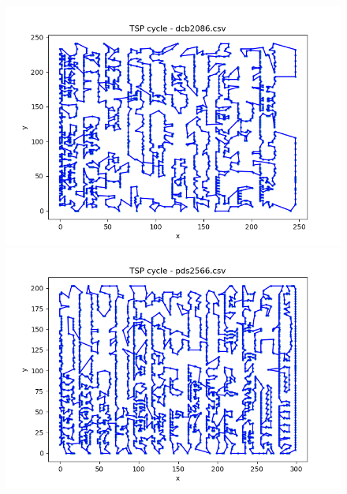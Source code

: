 \documentclass[12pt]{article}
\begin{document}
        \begin{figure}[h]
            \centering
            \includegraphics[width=0.8\linewidth]{img/dcb2086.png}
            \label{fig:dcb2086}
            \includegraphics[width=0.8\linewidth]{img/pds2566.png}
            \label{fig:pds2566}
        \end{figure}

\newpage
\end{document}
